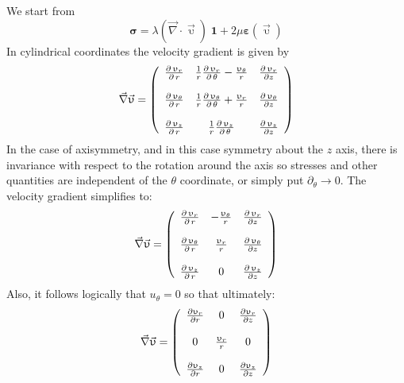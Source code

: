 We start from 
\begin{equation}
{\bm \sigma} = 
\lambda (\vec\nabla\cdot\vec{\upupsilon}) \;  {\bm 1}
+2 \mu {\bm \varepsilon}(\vec{\upupsilon})
\label{eq:elast_as}
\end{equation}
In cylindrical coordinates the velocity gradient is given by 
\[
\vec\nabla \vec{\upupsilon}  =
\left(
\begin{array}{ccc}
{\partial \, \upupsilon_r \over \partial \, r} &
{1 \over r} {\partial \, \upupsilon_r \over \partial \, \theta} - {\upupsilon_{\theta} \over r} &
{\partial \, \upupsilon_r \over \partial z} \\
\\
{\partial \, \upupsilon_{\theta} \over \partial \, r} &
{1 \over r} {\partial \, \upupsilon_{\theta} \over \partial \, \theta} + {\upupsilon_r \over r} &
{\partial \, \upupsilon_{\theta} \over \partial z} \\
\\
{\partial \, \upupsilon_{z} \over \partial \, r} &
{1 \over r} {\partial \, \upupsilon_{z} \over \partial \, \theta} &
{\partial \, \upupsilon_{z} \over \partial z}
\end{array}
\right)
\]
In the case of axisymmetry, and in this case symmetry about the $z$ axis, there is invariance with respect to the rotation around the axis so stresses and other quantities are independent of the $\theta$ coordinate, or simply put $\partial_\theta \rightarrow 0$.
The velocity gradient simplifies to:
\[
\vec\nabla \vec{\upupsilon}  =
\left(
\begin{array}{ccc}
{\partial \, \upupsilon_r \over \partial \, r} &
- {\upupsilon_{\theta} \over r} &
{\partial \, \upupsilon_r \over \partial z} \\
\\
{\partial \, \upupsilon_{\theta} \over \partial \, r} &
{\upupsilon_r \over r} &
{\partial \, \upupsilon_{\theta} \over \partial z} \\
\\
{\partial \, \upupsilon_{z} \over \partial \, r} &
0 &
{\partial \, \upupsilon_{z} \over \partial z}
\end{array}
\right)
\]
Also, it follows logically that $u_\theta=0$ so that ultimately:
\[
\vec\nabla \vec{\upupsilon}  =
\left(
\begin{array}{ccc}
\frac{\partial \upupsilon_r}{\partial r} & 0 & 
{\partial  \upupsilon_r \over \partial z} \\\\
0 & {\upupsilon_r \over r} & 0 \\ \\
{\partial \upupsilon_{z} \over \partial  r} & 0 & 
{\partial  \upupsilon_{z} \over \partial z}
\end{array}
\right)
\]
